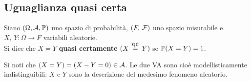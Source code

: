\par
{}

\subsection{Uguaglianza quasi certa}
\begin{defn}
  Siano $(\Omega, \mathcal A, \mathbb P)$ uno spazio di probabilità, $(F, \, \mathcal F)$ uno spazio misurabile e $X, \, Y: \Omega \to F$ variabili aleatorie.\\
  Si dice che $X = Y$ \textbf{quasi certamente} $(X \aceq Y)$ se $\mathbb P(X=Y)=1$.
\end{defn}

\begin{nb}
  Si noti che $(X = Y) = (X - Y = 0) \in \mathcal A$. Le due VA sono cioè modellisticamente indistinguibili: $X$ e $Y$ sono la descrizione del medesimo fenomeno aleatorio.
\end{nb}

